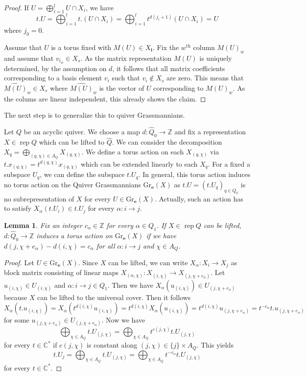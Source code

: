 \documentclass{amsart}
\newtheorem{lemma}[theorem]{Lemma}
\newcommand{\bfe}{\mathbf{e}}
\newcommand{\bfi}{\mathbf{i}}
\newcommand{\C}{\mathbb{C}}
\newcommand{\rep}{\operatorname{rep}}
\newcommand{\Gr}{\mathrm{Gr}}
\newcommand{\ZZ}{\mathbb{Z}}
\begin{document}
\begin{proof}
  If $U=\bigoplus_{i=1}^l U\cap X_i$, we have 
\[t.U=\bigoplus_{i=1}^l t.(U\cap X_i)=\bigoplus_{i=1}^l t^{d(j_i+1)}(U\cap X_i)=U\]
where $j_0=0$.

Assume that $U$ is a torus fixed with $M(U)\in X_{\bfi}$. Fix the $w^{\mathrm{th}}$ column $M(U)_w$ and assume that $v_{i_w}\in X_s$. As the matrix representation $M(U)$ is uniquely determined, by the assumption on $d$, it follows that all matrix coefficients corresponding to a basis element $v_i$ such that $v_i\notin X_s$ are zero. This means that $\widehat{M(U)}_w\in X_s$ where $\widehat{M(U)}_w$ is the vector of $U$ corresponding to $M(U)_w$. As the colums are linear independent, this already shows the claim.
\end{proof}
The next step is to generalize this to quiver Grassmannians.

Let $Q$ be an acyclic quiver. We choose a map $d:\hat Q_0\to\ZZ$ and fix a representation $X\in\rep Q$ which can be lifted to $\hat Q$. We can consider the decomposition $X_q=\bigoplus_{(q,\chi)\in A_Q} X_{(q,\chi)}$. We define a torus action on each $X_{(q,\chi)}$ via $t.x_{(q,\chi)}=t^{d(q,\chi)}x_{(q,\chi)}$ which can be extended linearly to each $X_q$. For a fixed a subspace $U_q$, we can define the subspace $t.U_q$. In general, this torus action induces no torus action on the Quiver Grassmannians $\Gr_{\bfe}(X)$ as $t.U=(t.U_q)_{q\in Q_0}$ is no subrepresentation of $X$ for every $U\in \Gr_{\bfe}(X)$. Actually, such an action has to satisfy $X_{\alpha}(t.U_i)\in t.U_j$ for every $\alpha:i\to j$. 
\begin{lemma}Fix an integer $c_\alpha\in\ZZ$ for every $\alpha\in Q_1$.
If $X\in\rep Q$ can be lifted, $d:\hat Q_0\to\ZZ$ induces a torus action on $\Gr_\bfe(X)$ if we have $d(j,\chi+e_\alpha)-d(i,\chi)=c_\alpha$ for all $\alpha:i\to j$ and $\chi\in A_{Q}$.
\end{lemma}
\begin{proof} 
  Let $U\in \Gr_\bfe(X)$. Since $X$ can be lifted, we can write $X_\alpha:X_i\to X_j$ as block matrix consisting of linear maps $X_{(\alpha,\chi)}:X_{(i,\chi)}\to X_{(j,\chi+e_\alpha)}$. Let $u_{(i,\chi)}\in U_{(i,\chi)}$ and $\alpha:i\to j\in Q_1$. Then we have $X_\alpha(u_{(i,\chi)})\in U_{(j,\chi+e_\alpha)}$ because $X$ can be lifted to the universal cover. Then it follows
\[X_\alpha(t.u_{(i,\chi)})=X_\alpha(t^{d(i,\chi)}u_{(i,\chi)})=t^{d(i,\chi)}X_\alpha(u_{(i,\chi)})=t^{d(i,\chi)}u_{(j,\chi+e_\alpha)}=t^{-c_\alpha}t.u_{(j,\chi+e_\alpha)}\]
for some $u_{(j,\chi+e_\alpha)}\in U_{(j,\chi+e_\alpha)}$.
Now we have \[\bigoplus_{\chi\in A_Q} t.U_{(j,\chi)}=\bigoplus_{\chi\in A_Q}t^{c(j,\chi)}t.U_{(j,\chi)}\]
for every $t\in\C^\ast$ if $c(j,\chi)$ is constant along $(j,\chi)\in \{j\}\times A_Q$. This yields  
\[t.U_j=\bigoplus_{\chi\in A_Q} t.U_{(j,\chi)}=\bigoplus_{\chi\in A_Q}t^{-c_\alpha}t.U_{(j,\chi)}\]
for every $t\in \C^\ast$.
\end{proof}
\end{document}

